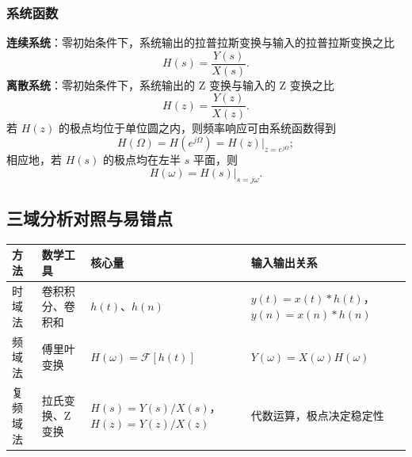 \subsubsection{系统函数}
\textbf{连续系统}：零初始条件下，系统输出的拉普拉斯变换与输入的拉普拉斯变换之比
\begin{equation}
H(s)=\frac{Y(s)}{X(s)}.
\end{equation}
\textbf{离散系统}：零初始条件下，系统输出的 Z 变换与输入的 Z 变换之比
\begin{equation}
H(z)=\frac{Y(z)}{X(z)}.
\end{equation}
若 $H(z)$ 的极点均位于单位圆之内，则频率响应可由系统函数得到
\begin{equation}
H(\Omega)=H(e^{j\Omega})=H(z)\Big|_{z=e^{j\Omega}};
\end{equation}
相应地，若 $H(s)$ 的极点均在左半 $s$ 平面，则
\begin{equation}
H(\omega)=H(s)\Big|_{s=j\omega}.
\end{equation}

\subsection{三域分析对照与易错点}
\begin{center}
\renewcommand{\arraystretch}{1.25}
\small
\begin{tabular}{p{1.9cm}p{3.2cm}p{3.4cm}p{5.4cm}}
\toprule
方法 & 数学工具 & 核心量 & 输入输出关系 \\
\midrule
时域法 & 卷积积分、卷积和 & $h(t)$、$h(n)$ & $y(t)=x(t)*h(t)$，$y(n)=x(n)*h(n)$ \\
频域法 & 傅里叶变换 & $H(\omega)=\mathcal{F}[h(t)]$ & $Y(\omega)=X(\omega)H(\omega)$ \\
复频域法 & 拉氏变换、Z 变换 & $H(s)=Y(s)/X(s)$，$H(z)=Y(z)/X(z)$ & 代数运算，极点决定稳定性 \\
\bottomrule
\end{tabular}
\end{center}

